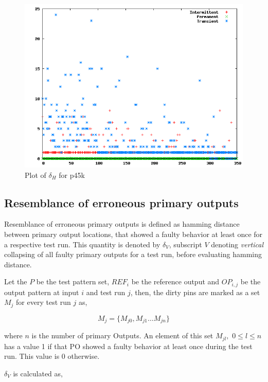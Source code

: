 \begin{figure}[h]
  \begin{center}
    \captionsetup{justification=centering}
    \includegraphics[scale=0.35]{figures/deltahp45k.png}
    \caption{Plot of $\delta_H$ for p45k}
    \label{fig:deltahp45k}
  \end{center}
\end{figure}

\subsection{Resemblance of erroneous primary outputs}
Resemblance of erroneous primary outputs is defined as hamming distance between primary output locations, that showed a faulty behavior at least once for a respective test run. This quantity is denoted by $\delta_V$, subscript $V$ denoting \emph{vertical} collapsing of all faulty primary outputs for a test run, before evaluating hamming distance.

Let the $P$ be the test pattern set, $REF_i$ be the reference output and $OP_{i,j}$ be the output pattern at input $i$ and test run $j$, then, the dirty pins are marked as a set $M_j$ for every test run $j$ as,

\[M_j = \{M_{j0}, M_{j1} \ldots M_{jn}\}\]

where $n$ is the number of primary Outputs. An element of this set $M_{jl},$ $0\leq l \leq n$ has a value 1 if that PO showed a faulty behavior at least once during the test run. This value is 0 otherwise.

$\delta_V$ is calculated as,

